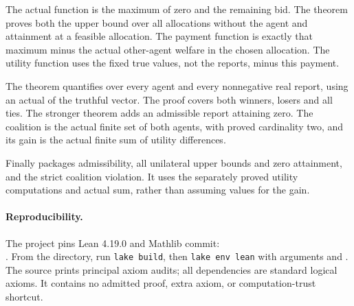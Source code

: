 \documentclass[11pt]{article}
\begin{document}
The actual function  is the maximum of zero and the remaining bid. The theorem  proves both the upper bound over all allocations without the agent and attainment at a feasible allocation. The payment function is exactly that maximum minus the actual other-agent welfare in the chosen allocation. The utility function uses the fixed true values, not the reports, minus this payment.

The theorem  quantifies over every agent and every nonnegative real report, using an actual  of the truthful vector. The proof covers both winners, losers and all ties. The stronger theorem  adds an admissible report attaining zero. The coalition is the actual finite set of both agents, with proved cardinality two, and its gain is the actual finite sum of utility differences.

Finally  packages admissibility, all unilateral upper bounds and zero attainment, and the strict coalition violation. It uses the separately proved utility computations and actual sum, rather than assuming values for the gain.

\paragraph{Reproducibility.}
The project pins Lean 4.19.0 and Mathlib commit:\\
.
From the  directory, run \texttt{lake build}, then
\texttt{lake env lean} with arguments  and .
The source prints principal axiom audits; all dependencies are standard logical axioms. It contains no admitted proof, extra axiom, or computation-trust shortcut.
\end{document}

